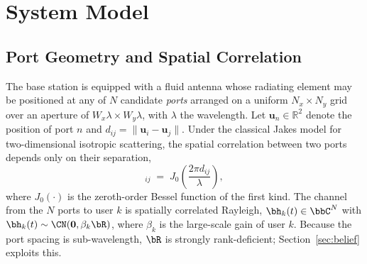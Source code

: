 %
%
%

\section{System Model}
\label{sec:model}

\subsection{Port Geometry and Spatial Correlation}
The base station is equipped with a fluid antenna whose radiating element may be
positioned at any of $N$ candidate \emph{ports} arranged on a uniform
$N_x\times N_y$ grid over an aperture of $W_x\lambda \times W_y\lambda$, with
$\lambda$ the wavelength. Let $\mathbf{u}_n\in\mathbb{R}^2$ denote the position
of port $n$ and $d_{ij}=\|\mathbf{u}_i-\mathbf{u}_j\|$. Under the classical
Jakes model for two-dimensional isotropic scattering, the spatial correlation
between two ports depends only on their separation,
\begin{equation}
  [\bR]_{ij} \;=\; J_0\!\left(\frac{2\pi d_{ij}}{\lambda}\right),
  \label{eq:R}
\end{equation}
where $J_0(\cdot)$ is the zeroth-order Bessel function of the first kind. The
channel from the $N$ ports to user $k$ is spatially correlated Rayleigh,
$\bh_k(t)\in\bbC^{N}$ with $\bh_k(t)\sim\CN(\mathbf{0},\beta_k\bR)$, where
$\beta_k$ is the large-scale gain of user $k$. Because the port spacing is
sub-wavelength, $\bR$ is strongly rank-deficient; Section~\ref{sec:belief}
exploits this.

